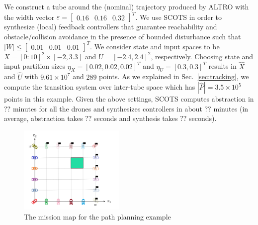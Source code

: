We construct a tube around the (nominal) trajectory produced by ALTRO with the width vector $\varepsilon=\begin{bmatrix}0.16&0.16&0.32\end{bmatrix}^T$.
 We use SCOTS in order to synthesize (local) feedback controllers that guarantee reachability and obstacle/collision avoidance in the presence of bounded disturbance such that $|W|\leq \begin{bmatrix}0.01&0.01&0.01\end{bmatrix}^T$. We consider state and input spaces to be $X=[0:10]^2\times[-2,3.3]$ and
$U=[-2.4,2.4]^2$, respectively. Choosing state and input partition sizes $\eta_{X}=[0.02,0.02,0.02]^T$ and
$\eta_{U}=[0.3,0.3]^T$ results in $\hat X$ and $\hat U$ with $9.61\times 10^7$ and $289$ points. As we explained in Sec.~\ref{sec:tracking}, we compute the transition system over inter-tube space which has $|\hat P|=3.5\times 10^5$ points in this example.%
Given the above settings, SCOTS computes abstraction in $??$ minutes for all the drones and synthesizes controllers in about $??$ minutes (in average, abstraction takes $??$ seconds and synthesis takes $??$ seconds). 

\begin{figure}[t]
	\centering
	\includegraphics[width=0.45\textwidth]{figures/MA1.png}
	\caption{The mission map for the path planning example}
\end{figure}\label{fig:MA}


